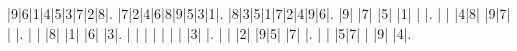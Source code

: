 \setlength\sudokusize{8cm}
\begin{sudoku}
|9|6|1|4|5|3|7|2|8|.
|7|2|4|6|8|9|5|3|1|.
|8|3|5|1|7|2|4|9|6|.
|9| |7| |5| |1| | |.
| | |4|8| |9|7| | |.
| | |8| |1| |6| |3|.
| | | | | | | |3| |.
| | |2| |9|5| |7| |.
| | |5|7| | |9| |4|.
\end{sudoku}